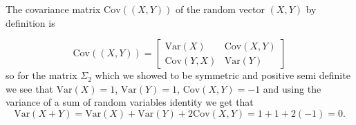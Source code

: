 
The covariance matrix $ \mathrm{Cov}((X,Y))$ of the random vector $ (X,Y)$ by definition is 

\[
    \mathrm{Cov}((X,Y)) = \begin{bmatrix}
	\mathrm{Var}(X) & \mathrm{Cov}(X,Y) \\
        \mathrm{Cov}(Y,X)& \mathrm{Var}(Y)
    \end{bmatrix}
\] 
so for the matrix $ \Sigma_2$ which we showed to be symmetric and positive semi definite we see that 
$ \mathrm{Var}(X) = 1$, $ \mathrm{Var}(Y) = 1$, $ \mathrm{Cov}(X,Y) = -1$ and using the variance of a sum of random
variables identity we get that 
\[
    \mathrm{Var}(X+Y) = \mathrm{Var}(X) + \mathrm{Var}(Y) +2 \mathrm{Cov}(X,Y) = 1 +1 + 2(-1) = 0
.\] 
